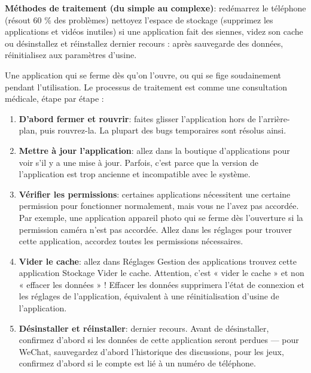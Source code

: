 \textbf{Méthodes de traitement (du simple au complexe)}: redémarrez le téléphone (résout 60 \% des problèmes) nettoyez l'espace de stockage (supprimez les applications et vidéos inutiles) si une application fait des siennes, videz son cache ou désinstallez et réinstallez dernier recours : après sauvegarde des données, réinitialisez aux paramètres d'usine.


Une application qui se ferme dès qu'on l'ouvre, ou qui se fige soudainement pendant l'utilisation. Le processus de traitement est comme une consultation médicale, étape par étape :

\begin{enumerate}
  \item \textbf{D'abord fermer et rouvrir}: faites glisser l'application hors de l'arrière-plan, puis rouvrez-la. La plupart des bugs temporaires sont résolus ainsi.
  \item \textbf{Mettre à jour l'application}: allez dans la boutique d'applications pour voir s'il y a une mise à jour. Parfois, c'est parce que la version de l'application est trop ancienne et incompatible avec le système.
  \item \textbf{Vérifier les permissions}: certaines applications nécessitent une certaine permission pour fonctionner normalement, mais vous ne l'avez pas accordée. Par exemple, une application appareil photo qui se ferme dès l'ouverture si la permission caméra n'est pas accordée. Allez dans les réglages pour trouver cette application, accordez toutes les permissions nécessaires.
  \item \textbf{Vider le cache}: allez dans Réglages Gestion des applications trouvez cette application Stockage Vider le cache. Attention, c'est « vider le cache » et non « effacer les données » ! Effacer les données supprimera l'état de connexion et les réglages de l'application, équivalent à une réinitialisation d'usine de l'application.
  \item \textbf{Désinstaller et réinstaller}: dernier recours. Avant de désinstaller, confirmez d'abord si les données de cette application seront perdues — pour WeChat, sauvegardez d'abord l'historique des discussions, pour les jeux, confirmez d'abord si le compte est lié à un numéro de téléphone.
\end{enumerate}


